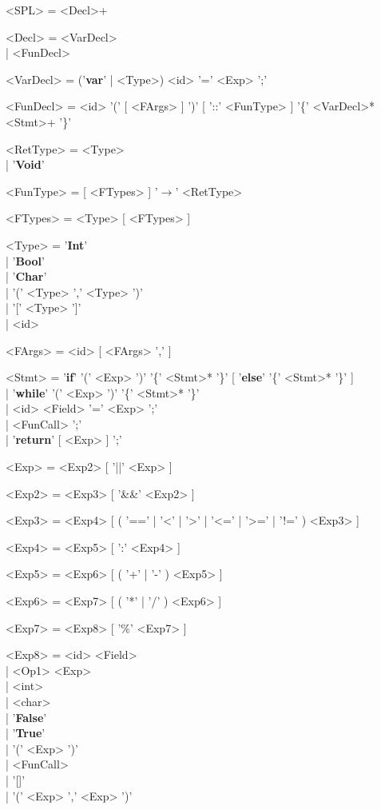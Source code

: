 \documentclass{article}
\begin{document}
\begin{grammar}
<SPL> = <Decl>+

<Decl> = <VarDecl> \\| <FunDecl>

<VarDecl> = ('\textbf{var}' | <Type>) <id> '=' <Exp> ';'

<FunDecl> = <id> '(' [ <FArgs> ] ')' [ '::' <FunType> ] '\{' <VarDecl>* <Stmt>+ '\}'

<RetType> = <Type> \\| '\textbf{Void}'

<FunType> = [ <FTypes> ] '$\rightarrow$' <RetType>

<FTypes> = <Type> [ <FTypes> ]

<Type> = '\textbf{Int}' \\| '\textbf{Bool}' \\| '\textbf{Char}' \\| '(' <Type> ',' <Type> ')' \\| '[' <Type> ']' \\| <id>

<FArgs> = <id> [ <FArgs> ',' ]

<Stmt> = '\textbf{if}' '(' <Exp> ')' '\{' <Stmt>* '\}' [ '\textbf{else}' '\{' <Stmt>* '\}' ] \\| '\textbf{while}' '(' <Exp> ')' '\{' <Stmt>* '\}' \\| <id> <Field> '=' <Exp> ';' \\| <FunCall> ';' \\| '\textbf{return}' [ <Exp> ] ';'

<Exp> = <Exp2> [ '||' <Exp> ]

<Exp2> = <Exp3> [ '\&\&' <Exp2> ]

<Exp3> = <Exp4> [ ( '==' | '\textless' | '\textgreater' | '\textless=' | '\textgreater=' | '!=' ) <Exp3> ]

<Exp4> = <Exp5> [ ':' <Exp4> ]

<Exp5> = <Exp6> [ ( '+' | '-' ) <Exp5> ]

<Exp6> = <Exp7> [ ( '*' | '/' ) <Exp6> ]

<Exp7> = <Exp8> [ '\%' <Exp7> ]

<Exp8> = <id> <Field> \\| <Op1> <Exp> \\| <int> \\| <char> \\| '\textbf{False}' \\| '\textbf{True}' \\| '(' <Exp> ')' \\| <FunCall> \\| '[]' \\| '(' <Exp> ',' <Exp> ')'


\end{grammar}
\end{document}
